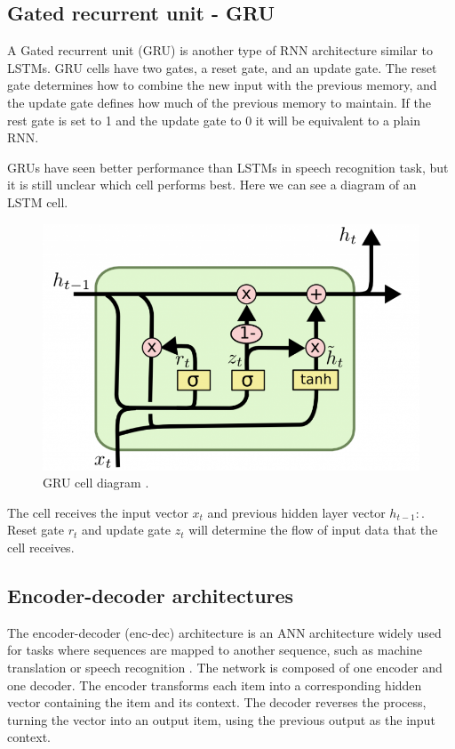 \documentclass{kththesis}
\begin{document}
\subsection{Gated recurrent unit - GRU}
A Gated recurrent unit (GRU)\cite{gru} is another type of RNN architecture similar to LSTMs. GRU cells have two gates, a reset gate\cite{gru-forget}, and an update gate. The reset gate determines how to combine the new input with the previous memory, and the update gate defines how much of the previous memory to maintain. If the rest gate is set to 1 and the update gate to 0 it will be equivalent to a plain RNN.

GRUs have seen better performance than LSTMs in speech recognition task\cite{gru-speech}, but it is still unclear which cell performs best. Here we can see a diagram of an LSTM cell. 

\begin{figure}[H]
    \centering
    \includegraphics[scale=0.6]{GRU-core.png}
    \caption{GRU cell diagram  \cite{daniel}.}
    
\end{figure}

The cell receives the input vector $x_{t}$ and previous hidden layer vector $h_{t-1}:$. Reset gate $r_t$ and update gate $z_t$ will determine the flow of input data that the cell receives.

\subsection{Encoder-decoder architectures}
The encoder-decoder (enc-dec) architecture is an ANN architecture widely used for tasks where sequences are mapped to another sequence, such as machine translation or speech recognition \cite{encoder-decoder}. The network is composed of one encoder and one decoder. The encoder transforms each item into a corresponding hidden vector containing the item and its context. The decoder reverses the process, turning the vector into an output item, using the previous output as the input context.
\end{document}
